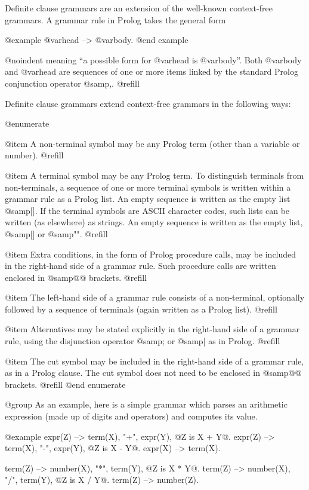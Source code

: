 Definite clause grammars are an extension of the well-known context-free
grammars.  A grammar rule in Prolog takes the general form

@example
@var{head} --> @var{body}.
@end example

@noindent
meaning ``a possible form for @var{head} is @var{body}''.  Both
@var{body} and @var{head} are sequences of one or more items linked by the
standard Prolog conjunction operator @samp{,}. @refill

Definite clause grammars extend context-free grammars in the following ways:

@enumerate

@item
A non-terminal symbol may be any Prolog term (other than a variable or
number). @refill

@item
A terminal symbol may be any Prolog term.  To distinguish terminals from
non-terminals, a sequence of one or more terminal symbols is written within
a grammar rule as a Prolog list.  An empty sequence is written as the empty
list @samp{[]}.  If the terminal symbols are ASCII character codes, such
lists can be written (as elsewhere) as strings.  An empty sequence is
written as the empty list, @samp{[]} or @samp{""}. @refill

@item
Extra conditions, in the form of Prolog procedure calls, may be included in
the right-hand side of a grammar rule.  Such procedure calls are written
enclosed in @samp{@{@}} brackets. @refill

@item
The left-hand side of a grammar rule consists of a non-terminal, optionally
followed by a sequence of terminals (again written as a Prolog list). @refill

@item
Alternatives may be stated explicitly in the right-hand side of a
grammar rule, using the disjunction operator @samp{;} or @samp{|} as in
Prolog. @refill

@item
The cut symbol may be included in the right-hand side of a grammar rule, as
in a Prolog clause.  The cut symbol does not need to be enclosed in
@samp{@{@}} brackets. @refill
@end enumerate

@group
As an example, here is a simple grammar which parses an arithmetic
expression (made up of digits and operators) and computes its value.

@example
expr(Z) --> term(X), "+", expr(Y), @{Z is X + Y@}.
expr(Z) --> term(X), "-", expr(Y), @{Z is X - Y@}.
expr(X) --> term(X).

term(Z) --> number(X), "*", term(Y), @{Z is X * Y@}.
term(Z) --> number(X), "/", term(Y), @{Z is X / Y@}.
term(Z) --> number(Z).


